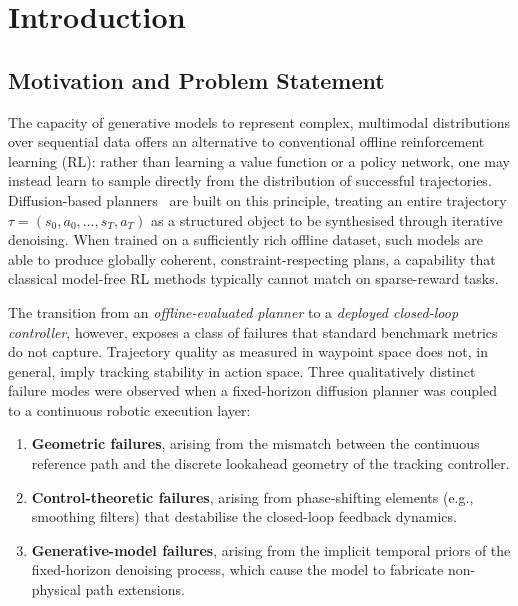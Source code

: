 \documentclass[12pt, a4paper, oneside]{report}
\theoremstyle{definition}
\begin{document}
\chapter{Introduction}
\label{chap:intro}

\section{Motivation and Problem Statement}
\label{sec:motivation}

The capacity of generative models to represent complex,
multimodal distributions over sequential data offers an alternative
to conventional offline reinforcement learning (RL): rather than
learning a value function or a policy network, one may instead
learn to sample directly from the distribution of successful
trajectories. Diffusion-based planners~\citep{janner2022diffuser,
ajay2023is, ho2020ddpm} are built on this principle, treating an
entire trajectory $\tau = (s_0, a_0, \ldots, s_T, a_T)$ as a
structured object to be synthesised through iterative denoising.
When trained on a sufficiently rich offline dataset, such models
are able to produce globally coherent, constraint-respecting plans,
a capability that classical model-free RL methods typically cannot
match on sparse-reward tasks.

The transition from an \emph{offline-evaluated planner} to a
\emph{deployed closed-loop controller}, however, exposes a class of
failures that standard benchmark metrics do not capture.
Trajectory quality as measured in waypoint space does not, in
general, imply tracking stability in action space. Three
qualitatively distinct failure modes were observed when a
fixed-horizon diffusion planner was coupled to a continuous robotic
execution layer:

\begin{enumerate}[label=(\roman*), itemsep=4pt]
  \item \textbf{Geometric failures}, arising from the mismatch
        between the continuous reference path and the discrete
        lookahead geometry of the tracking controller.
  \item \textbf{Control-theoretic failures}, arising from
        phase-shifting elements (e.g., smoothing filters) that
        destabilise the closed-loop feedback dynamics.
  \item \textbf{Generative-model failures}, arising from the
        implicit temporal priors of the fixed-horizon denoising
        process, which cause the model to fabricate non-physical
        path extensions.
\end{enumerate}
\end{document}
